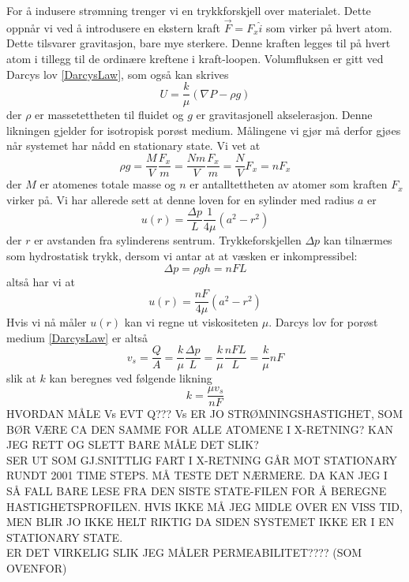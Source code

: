 \documentclass[english, a4paper]{article}
\begin{document}
\noindent
For å indusere strømning trenger vi en trykkforskjell over materialet. Dette oppnår vi ved å
introdusere en ekstern kraft $\vec{F} = F_x\hat{i}$ som virker på hvert atom. 
Dette tilsvarer gravitasjon, bare mye sterkere. Denne kraften legges til på hvert atom
i tillegg til de ordinære kreftene i kraft-loopen. Volumfluksen er gitt ved Darcys lov \eqref{DarcysLaw}, 
som også kan skrives
\begin{equation}
 U = \frac{k}{\mu} (\nabla P - \rho g)
\end{equation}
der $\rho$ er massetettheten til fluidet og $g$ er gravitasjonell akselerasjon. 
Denne likningen gjelder for isotropisk porøst medium. Målingene vi gjør må derfor gjøes når systemet
har nådd en stationary state. Vi vet at
\begin{equation}
 \rho g = \frac{M}{V} \frac{F_x}{m} = \frac{Nm}{V}\frac{F_x}{m} = \frac{N}{V}F_x = nF_x
\end{equation}
der $M$ er atomenes totale masse og $n$ er antalltettheten av atomer som kraften $F_x$ virker på. 
Vi har allerede sett at denne loven for en sylinder med radius $a$ er
\begin{equation}
  u(r) = \frac{\Delta p}{L} \frac{1}{4\mu} (a^2 - r^2)
\end{equation}
der $r$ er avstanden fra sylinderens sentrum. Trykkeforskjellen $\Delta p$ kan tilnærmes
som hydrostatisk trykk, dersom vi antar at at væsken er inkompressibel:
\begin{equation}
 \Delta p = \rho gh = nFL
\end{equation}
altså har vi at
\begin{equation}
 u(r) = \frac{nF}{4\mu}(a^2 - r^2)
\end{equation}
Hvis vi nå måler $u(r)$ kan vi regne ut viskositeten $\mu$. Darcys lov for porøst medium \eqref{DarcysLaw}
er altså
\begin{equation}
 v_s = \frac{Q}{A} = \frac{k}{\mu}\frac{\Delta p}{L} = \frac{k}{\mu}\frac{nFL}{L} = \frac{k}{\mu}nF
\end{equation}
slik at $k$ kan beregnes ved følgende likning
\begin{equation}
 k = \frac{\mu v_s}{nF}
\end{equation}
HVORDAN MÅLE Vs EVT Q??? Vs ER JO STRØMNINGSHASTIGHET, SOM BØR VÆRE CA DEN SAMME FOR ALLE 
ATOMENE I X-RETNING? KAN JEG RETT OG SLETT BARE MÅLE DET SLIK?\\
SER UT SOM GJ.SNITTLIG FART I X-RETNING GÅR MOT STATIONARY RUNDT 2001 TIME STEPS. 
MÅ TESTE DET NÆRMERE. DA KAN JEG I SÅ FALL BARE LESE FRA DEN SISTE STATE-FILEN FOR Å 
BEREGNE HASTIGHETSPROFILEN. HVIS IKKE MÅ JEG MIDLE OVER EN VISS TID, MEN BLIR JO IKKE HELT RIKTIG 
DA SIDEN SYSTEMET IKKE ER I EN STATIONARY STATE. \\
ER DET VIRKELIG SLIK JEG MÅLER PERMEABILITET???? (SOM OVENFOR)
\end{document}
